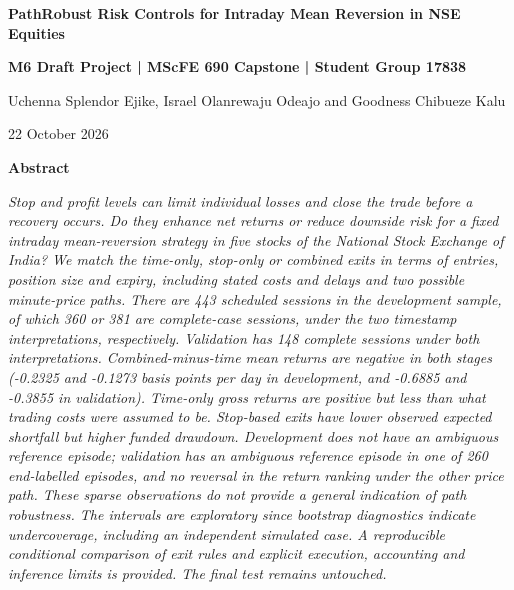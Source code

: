 \documentclass[11pt,a4paper]{article}
\begin{document}
\justifying


\begin{center}{\fontsize{14}{17}\selectfont\bfseries Path\allowbreak{}Robust Risk Controls for Intraday Mean Reversion in NSE Equities\par}\vspace{6pt}

\textbf{M6 Draft Project | MScFE 690 Capstone | Student Group 17838}\par\vspace{4pt}

Uchenna Splendor Ejike, Israel Olanrewaju Odeajo and Goodness Chibueze Kalu\par\vspace{4pt}

22 October 2026\par\vspace{4pt}

\end{center}

\begin{center}\bfseries Abstract\end{center}

{\itshape\noindent Stop and profit levels can limit individual losses and close the trade before a recovery occurs. Do they enhance net returns or reduce downside risk for a fixed intraday mean-reversion strategy in five stocks of the National Stock Exchange of India? We match the time-only, stop-only or combined exits in terms of entries, position size and expiry, including stated costs and delays and two possible minute-price paths. There are 443 scheduled sessions in the development sample, of which 360 or 381 are complete-case sessions, under the two timestamp interpretations, respectively. Validation has 148 complete sessions under both interpretations. Combined-minus-time mean returns are negative in both stages (-0.2325 and -0.1273 basis points per day in development, and -0.6885 and -0.3855 in validation). Time-only gross returns are positive but less than what trading costs were assumed to be. Stop-based exits have lower observed expected shortfall but higher funded drawdown. Development does not have an ambiguous reference episode; validation has an ambiguous reference episode in one of 260 end-labelled episodes, and no reversal in the return ranking under the other price path. These sparse observations do not provide a general indication of path robustness. The intervals are exploratory since bootstrap diagnostics indicate undercoverage, including an independent simulated case. A reproducible conditional comparison of exit rules and explicit execution, accounting and inference limits is provided. The final test remains untouched.\par}
\end{document}
